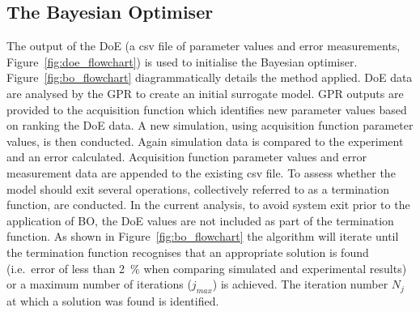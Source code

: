 \documentclass[preprint, review, 12pt]{elsarticle}
\begin{document}
	\subsection{The Bayesian Optimiser}
	\label{h:bayesian_opt}
	The output of the DoE (a csv file of parameter values and error measurements, Figure~\ref{fig:doe_flowchart}) is used to initialise the Bayesian optimiser.
	Figure~\ref{fig:bo_flowchart} diagrammatically details the method applied.
	DoE data are analysed by the GPR to create an initial surrogate model.
	GPR outputs are provided to the acquisition function which identifies new parameter values based on ranking the DoE data.
	A new simulation, using acquisition function parameter values, is then conducted.
	Again simulation data is compared to the experiment and an error calculated.
	Acquisition function parameter values and error measurement data are appended to the existing csv file.
	To assess whether the model should exit several operations, collectively referred to as a termination function, are conducted.
	In the current analysis, to avoid system exit prior to the application of BO, the DoE values are not included as part of the termination function.
	As shown in Figure~\ref{fig:bo_flowchart} the algorithm will iterate until the termination function recognises that an appropriate solution is found (i.e.\ error of less than 2~\% when comparing simulated and experimental results) or a maximum number of iterations ($j_{max}$) is achieved.
	The iteration number $N_j$ at which a solution was found is identified.
\end{document}
